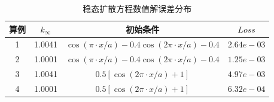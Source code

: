 \documentclass{Sichuan Normal University}
\begin{document}
\begin{table}[H]
    \caption{稳态扩散方程数值解误差分布}
    \centering
    \begin{tabular}{cccc}
        \toprule
        \textbf{算例} & \textbf{$k_{\infty}$} & \textbf{初始条件} & $Loss$ \\
        \midrule
        1 & 1.0041 & $\cos (\pi \cdot x / a)-0.4 \cos (2 \pi \cdot x / a)-0.4$ & $2.64e-03$ \\
        2 & 1.0001 & $\cos (\pi \cdot x / a)-0.4 \cos (2 \pi \cdot x / a)-0.4$ & $1.25e-03$ \\
        3 & 1.0041 & $0.5[\cos (2 \pi \cdot x / a)+1]$ & $4.97e-03$ \\
        4 & 1.0001 & $0.5[\cos (2 \pi \cdot x / a)+1]$ & $6.32e-04$ \\
        \bottomrule
    \end{tabular}
    \label{tab:error_distribution}
\end{table}
\end{document}
